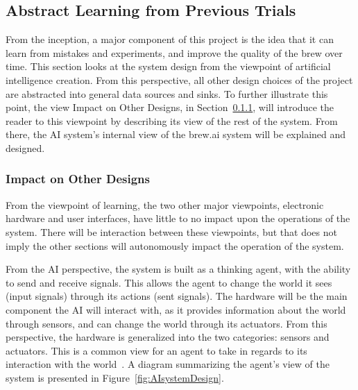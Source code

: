 \documentclass[draftclsnofoot,onecolumn,letterpaper,10pt]{IEEEtran}
\begin{document}
\subsection{Abstract Learning from Previous Trials} %
From the inception, a major component of this project is the idea that it can learn from mistakes and experiments, and improve the quality of the brew over time.
This section looks at the system design from the viewpoint of artificial intelligence creation.
From this perspective, all other design choices of the project are abstracted into general data sources and sinks.
To further illustrate this point, the view Impact on Other Designs, in Section~\ref{sec:AIImpact}, will introduce the reader to this viewpoint by describing its view of the rest of the system.
From there, the AI system's internal view of the brew.ai system will be explained and designed.

\subsubsection{Impact on Other Designs}\label{sec:AIImpact}
From the viewpoint of learning, the two other major viewpoints, electronic hardware and user interfaces, have little to no impact upon the operations of the system.
There will be interaction between these viewpoints, but that does not imply the other sections will autonomously impact the operation of the system.

From the AI perspective, the system is built as a thinking agent, with the ability to send and receive signals.
This allows the agent to change the world it sees (input signals) through its actions (sent signals).
The hardware will be the main component the AI will interact with, as it provides information about the world through sensors, and can change the world through its actuators.
From this perspective, the hardware is generalized into the two categories: sensors and actuators.
This is a common view for an agent to take in regards to its interaction with the world~\cite{RussellNorvig}.
A diagram summarizing the agent's view of the system is presented in Figure~\ref{fig:AIsystemDesign}.
\end{document}

